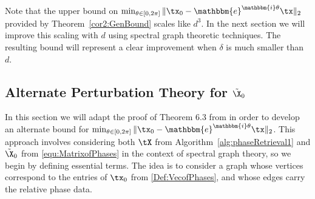 
Note that the upper bound on $\min_{\theta\in[0,2\pi]} \Vert \tx_0 - \mathbbm{e}^{\mathbbm{i}\theta}\tx \Vert_2$ provided by Theorem~\ref{cor2:GenBound} scales like $d^3$.  In the next section we will improve this scaling with $d$ using spectral graph theoretic techniques.  The resulting bound will represent a clear improvement when $\delta$ is much smaller than $d$.

\subsection{Alternate Perturbation Theory for $\tilde{\X}_0$}

In this section we will adapt the proof of Theorem 6.3 from \cite{FickusMixon} in order to develop an alternate bound for $\min_{\theta\in[0,2\pi]} \Vert \tx_0 - \mathbbm{e}^{\mathbbm{i}\theta}\tx \Vert_2$.  This approach involves considering both $\tX$ from Algorithm~\ref{alg:phaseRetrieval1} and $\tilde{\X}_0$ from \eqref{equ:MatrixofPhases} in the context of spectral graph theory, so we begin by defining essential terms.  The idea is to consider a graph whose vertices correspond to the entries of $\tx_0$ from \eqref{Def:VecofPhases}, and whose edges carry the relative phase data.




